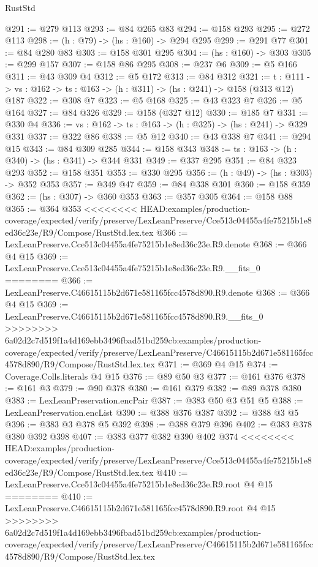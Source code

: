 \begin{lexlean}{RustStd}
\begin{coremodule}
{\begin{coremodule}
@291 := @279 @113
@293 := @84 @265 @83
@294 := @158 @293
@295 := @272 @113
@298 := (h : @79) -> (hs : @160) -> @294 @295
@299 := @291 @77
@301 := @84 @280 @83
@303 := @158 @301 @295
@304 := (hs : @160) -> @303
@305 := @299 @157
@307 := @158 @86 @295
@308 := @237 @6
@309 := @5 @166
@311 := @43 @309 @4
@312 := @5 @172
@313 := @84 @312
@321 := {t : @111} ->
  {vs : @162} -> {ts : @163} -> (h : @311) -> (hs : @241) -> @158 (@313 @12) @187
@322 := @308 @7
@323 := @5 @168
@325 := @43 @323 @7
@326 := @5 @164
@327 := @84 @326
@329 := @158 (@327 @12)
@330 := @185 @7
@331 := @330 @4
@336 := {vs : @162} -> {ts : @163} -> (h : @325) -> (hs : @241) -> @329 @331
@337 := @322 @86
@338 := @5 @12
@340 := @43 @338 @7
@341 := @294 @15
@343 := @84 @309 @285
@344 := @158 @343
@348 := {ts : @163} -> (h : @340) -> (hs : @341) -> @344 @331
@349 := @337 @295
@351 := @84 @323 @293
@352 := @158 @351
@353 := @330 @295
@356 := (h : @49) -> (hs : @303) -> @352 @353
@357 := @349 @47
@359 := @84 @338 @301
@360 := @158 @359
@362 := (hs : @307) -> @360 @353
@363 := @357 @305
@364 := @158 @88
@365 := @364 @353
<<<<<<<< HEAD:examples/production-coverage/expected/verify/preserve/LexLeanPreserve/Cce513c04455a4fe75215b1e8ed36c23e/R9/Compose/RustStd.lex.tex
@366 := LexLeanPreserve.Cce513c04455a4fe75215b1e8ed36c23e.R9.denote
@368 := @366 @4 @15
@369 := LexLeanPreserve.Cce513c04455a4fe75215b1e8ed36c23e.R9.__fits_0
========
@366 := LexLeanPreserve.C46615115b2d671e581165fcc4578d890.R9.denote
@368 := @366 @4 @15
@369 := LexLeanPreserve.C46615115b2d671e581165fcc4578d890.R9.__fits_0
>>>>>>>> 6a02d2c7d519f1a4d169ebb3496fbad51bd259cb:examples/production-coverage/expected/verify/preserve/LexLeanPreserve/C46615115b2d671e581165fcc4578d890/R9/Compose/RustStd.lex.tex
@371 := @369 @4 @15
@374 := Coverage.Colls.literals @4 @15
@376 := @89 @50 @3
@377 := @161 @376
@378 := @161 @3
@379 := @90 @378
@380 := @161 @379
@382 := @89 @378 @380
@383 := LexLeanPreservation.encPair
@387 := @383 @50 @3 @51 @5
@388 := LexLeanPreservation.encList
@390 := @388 @376 @387
@392 := @388 @3 @5
@396 := @383 @3 @378 @5 @392
@398 := @388 @379 @396
@402 := @383 @378 @380 @392 @398
@407 := @383 @377 @382 @390 @402 @374
<<<<<<<< HEAD:examples/production-coverage/expected/verify/preserve/LexLeanPreserve/Cce513c04455a4fe75215b1e8ed36c23e/R9/Compose/RustStd.lex.tex
@410 := LexLeanPreserve.Cce513c04455a4fe75215b1e8ed36c23e.R9.root @4 @15
========
@410 := LexLeanPreserve.C46615115b2d671e581165fcc4578d890.R9.root @4 @15
>>>>>>>> 6a02d2c7d519f1a4d169ebb3496fbad51bd259cb:examples/production-coverage/expected/verify/preserve/LexLeanPreserve/C46615115b2d671e581165fcc4578d890/R9/Compose/RustStd.lex.tex

\end{coremodule}}
\end{coremodule}
\end{lexlean}
